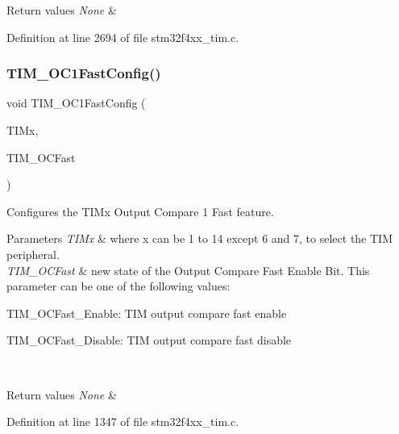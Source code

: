 \begin{DoxyRetVals}{Return values}
{\em None} & \\
\hline
\end{DoxyRetVals}


Definition at line 2694 of file stm32f4xx\+\_\+tim.\+c.

\mbox{\label{group___t_i_m_gaec82031ca62f31f5483195c09752a83a}} 
\subsubsection{\texorpdfstring{T\+I\+M\+\_\+\+O\+C1\+Fast\+Config()}{TIM\_OC1FastConfig()}}
{\footnotesize\ttfamily void T\+I\+M\+\_\+\+O\+C1\+Fast\+Config (\begin{DoxyParamCaption}\item[{\hyperlink{struct_t_i_m___type_def}{T\+I\+M\+\_\+\+Type\+Def} $\ast$}]{T\+I\+Mx,  }\item[{uint16\+\_\+t}]{T\+I\+M\+\_\+\+O\+C\+Fast }\end{DoxyParamCaption})}



Configures the T\+I\+Mx Output Compare 1 Fast feature. 


\begin{DoxyParams}{Parameters}
{\em T\+I\+Mx} & where x can be 1 to 14 except 6 and 7, to select the T\+IM peripheral. \\
\hline
{\em T\+I\+M\+\_\+\+O\+C\+Fast} & new state of the Output Compare Fast Enable Bit. This parameter can be one of the following values\+: \begin{DoxyItemize}
\item T\+I\+M\+\_\+\+O\+C\+Fast\+\_\+\+Enable\+: T\+IM output compare fast enable \item T\+I\+M\+\_\+\+O\+C\+Fast\+\_\+\+Disable\+: T\+IM output compare fast disable \end{DoxyItemize}
\\
\hline
\end{DoxyParams}

\begin{DoxyRetVals}{Return values}
{\em None} & \\
\hline
\end{DoxyRetVals}


Definition at line 1347 of file stm32f4xx\+\_\+tim.\+c.

